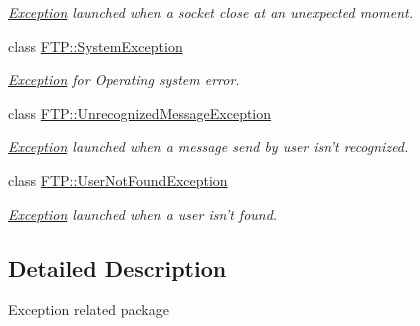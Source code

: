 \begin{DoxyCompactItemize}
\begin{DoxyCompactList}\small\item\em \hyperlink{classFTP_1_1Exception}{Exception} launched when a socket close at an unexpected moment. \end{DoxyCompactList}\item 
class \hyperlink{classFTP_1_1SystemException}{F\-T\-P\-::\-System\-Exception}
\begin{DoxyCompactList}\small\item\em \hyperlink{classFTP_1_1Exception}{Exception} for Operating system error. \end{DoxyCompactList}\item 
class \hyperlink{classFTP_1_1UnrecognizedMessageException}{F\-T\-P\-::\-Unrecognized\-Message\-Exception}
\begin{DoxyCompactList}\small\item\em \hyperlink{classFTP_1_1Exception}{Exception} launched when a message send by user isn't recognized. \end{DoxyCompactList}\item 
class \hyperlink{classFTP_1_1UserNotFoundException}{F\-T\-P\-::\-User\-Not\-Found\-Exception}
\begin{DoxyCompactList}\small\item\em \hyperlink{classFTP_1_1Exception}{Exception} launched when a user isn't found. \end{DoxyCompactList}\end{DoxyCompactItemize}


\subsection{Detailed Description}
Exception related package 